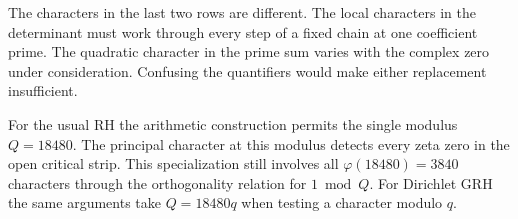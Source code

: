 \documentclass[11pt]{article}
\begin{document}
\par
The characters in the last two rows are different. The local characters in the determinant must work through every step of a fixed chain at one coefficient prime. The quadratic character in the prime sum varies with the complex zero under consideration. Confusing the quantifiers would make either replacement insufficient.
\par
For the usual RH the arithmetic construction permits the single modulus $Q=18480$. The principal character at this modulus detects every zeta zero in the open critical strip. This specialization still involves all $\varphi(18480)=3840$ characters through the orthogonality relation for $1\bmod Q$. For Dirichlet GRH the same arguments take $Q=18480q$ when testing a character modulo $q$.




\end{document}
